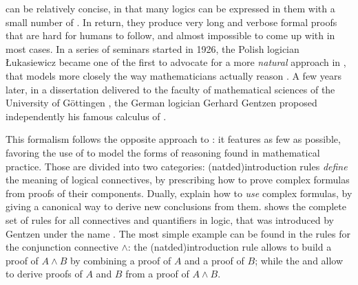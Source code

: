  can be relatively concise, in that many logics can be
expressed in them with a small number of . In return, they produce very
long and verbose formal proofs that are hard for humans to follow, and almost
impossible to come up with in most cases. In a series of seminars started in
1926, the Polish logician Łukasiewicz became one of the first to advocate for a
more \emph{natural} approach in , that models more closely the way
mathematicians actually reason . A few years
later, in a dissertation delivered to the faculty of mathematical sciences of
the University of Göttingen , the German
logician Gerhard Gentzen proposed independently his famous calculus of
.

This formalism follows the opposite approach to : it
features as few  as possible, favoring the use of \emph{} to model the forms of reasoning found in mathematical practice. Those
are divided into two categories: \intro(natded){introduction rules}
\emph{define} the meaning of logical connectives, by prescribing how to prove
complex formulas from proofs of their components. Dually,  explain how to \emph{use} complex formulas, by giving a canonical way to
derive new conclusions from them.  shows the complete set of
 rules for all connectives and quantifiers in
 logic, that was introduced by Gentzen under the name
\cite{gentzen_untersuchungen_1935}. The most simple example can be found in the
rules for the conjunction connective $\land$: the \kl(natded){introduction rule}
 allows to build a proof of $A \land B$ by combining a proof of $A$
and a proof of $B$; while the   and
 allow to derive proofs of $A$ and $B$ from a proof of $A \land
B$.

